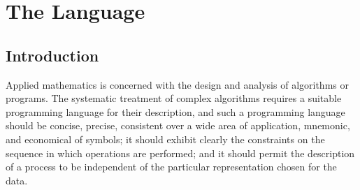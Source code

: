 
\chapter{The Language}

\section{Introduction}

\par Applied mathematics is concerned with the design and analysis of algorithms or programs. The systematic treatment of complex algorithms requires a suitable programming language for their description, and such a programming language should be concise, precise, consistent over a wide area of application, mnemonic, and economical of symbols; it should exhibit clearly the constraints on the sequence in which operations are performed; and it should permit the description of a process to be independent of the particular representation chosen for the data.
